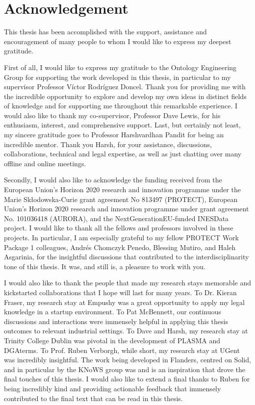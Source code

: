 %
\section*{Acknowledgement}
\label{sec::acknowledgement}

This thesis has been accomplished with the support, assistance and encouragement of many people to whom I would like to express my deepest gratitude.

First of all, I would like to express my gratitude to the Ontology Engineering Group for supporting the work developed in this thesis, in particular to my supervisor Professor Víctor Rodríguez Doncel.
Thank you for providing me with the incredible opportunity to explore and develop my own ideas in distinct fields of knowledge and for supporting me throughout this remarkable experience.
I would also like to thank my co-supervisor, Professor Dave Lewis, for his enthusiasm, interest, and comprehensive support.
Last, but certainly not least, my sincere gratitude goes to Professor Harshvardhan Pandit for being an incredible mentor.
Thank you Harsh, for your assistance, discussions, collaborations, technical and legal expertise, as well as just chatting over many offline and online meetings.

Secondly, I would also like to acknowledge the funding received from the European Union's Horizon 2020 research and innovation programme under the Marie Skłodowska-Curie grant agreement No 813497 (PROTECT), European Union’s Horizon 2020 research and innovation programme under grant agreement No. 101036418 (AURORA), and the NextGenerationEU-funded INESData project.
I would like to thank all the fellows and professors involved in these projects.
In particular, I am especially grateful to my fellow PROTECT Work Package 1 colleagues, Andrés Chomczyk Penedo, Blessing Mutiro, and Haleh Asgarinia, for the insightful discussions that contributed to the interdisciplinarity tone of this thesis.
It was, and still is, a pleasure to work with you.

I would also like to thank the people that made my research stays memorable and kickstarted collaborations that I hope will last for many years.
To Dr. Kieran Fraser, my research stay at Empushy was a great opportunity to apply my legal knowledge in a startup environment.
To Pat McBennett, our continuous discussions and interactions were immensely helpful in applying this thesis outcomes to relevant industrial settings.
To Dave and Harsh, my research stay at Trinity College Dublin was pivotal in the development of PLASMA and DGAterms.
To Prof. Ruben Verborgh, while short, my research stay at UGent was incredibly insightful.
The work being developed in Flanders, centred on Solid, and in particular by the KNoWS group was and is an inspiration that drove the final touches of this thesis.
I would also like to extend a final thanks to Ruben for being incredibly kind and providing actionable feedback that immensely contributed to the final text that can be read in this thesis.

